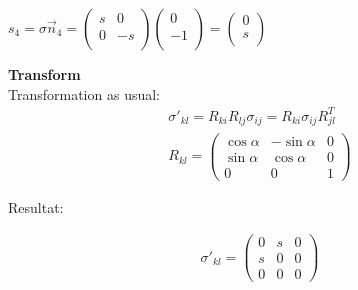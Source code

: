 \begin{minipage}{14cm}
	$s_4 = \sigma \vec n_4 = \begin{pmatrix}
	s & 0\\
	0 & -s\\
	\end{pmatrix} \begin{pmatrix}
	0\\
	-1\\
	\end{pmatrix} = \begin{pmatrix}
	0\\
	s\\
	\end{pmatrix}$
	
\end{minipage}

\textbf{Transform}\\
Transformation as usual:
\begin{align}
	\sigma'_{kl}=R_{ki}R_{lj}\sigma_{ij}=R_{ki}\sigma_{ij}R_{jl}^T \\
	R_{kl}=\begin{pmatrix} 
		\cos \alpha & -\sin \alpha & 0 \\
		\sin \alpha &  \cos \alpha & 0 \\            
		0        &  0           & 1
	\end{pmatrix}
\end{align}

Resultat:

\begin{align}
	\sigma'_{kl}=\begin{pmatrix}
		0 & s & 0 \\
		s & 0 & 0 \\
		0 & 0 & 0
	\end{pmatrix}
\end{align}

